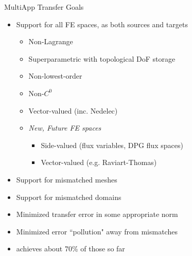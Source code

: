 \begin{frame}{MultiApp Transfer Goals}
\begin{itemize}
  \item Support for all  FE spaces, as both sources and
    targets
  \begin{itemize}
    \item Non-Lagrange
    \item Superparametric with topological DoF storage
    \item Non-lowest-order
    \item Non-$C^0$
    \item Vector-valued (inc. Nedelec)
    \item \emph{New, Future FE spaces}
    \begin{itemize}
      \item Side-valued (flux variables, DPG flux spaces)
      \item Vector-valued (e.g. Raviart-Thomas)
    \end{itemize}
  \end{itemize}
  \item Support for mismatched meshes
  \item Support for mismatched domains
  \item Minimized transfer error in some appropriate norm
  \item Minimized error ``pollution" away from mismatches
\end{itemize}

\vfill

\begin{itemize}
  \item {} achieves about 70\% of those so
    far
\end{itemize}
\end{frame}
